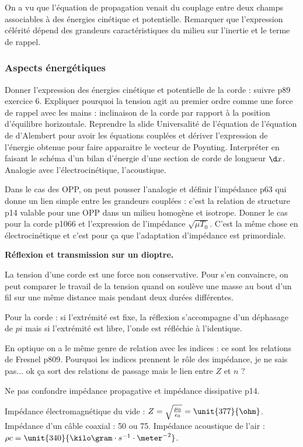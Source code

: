 \begin{transition}
On a vu que l'équation de propagation venait du couplage entre deux champs associables à des énergies  cinétique et potentielle.
Remarquer que l'expression célérité dépend des grandeurs caractéristiques du milieu sur l'inertie et le terme de rappel.
\end{transition}

\subsubsection{Aspects énergétiques}

Donner l'expression des énergies cinétique et potentielle de la corde : suivre  \cite{Brebec2004} p89 exercice 6.
Expliquer pourquoi la tension agit au premier ordre comme une force de rappel avec les mains : inclinaison de la corde par rapport à la position d'équilibre horizontale.
Reprendre la slide \og Universalité de l'équation de l'équation de d'Alembert \fg{} pour avoir les équations couplées et dériver l'expression de l'énergie obtenue pour faire apparaitre le vecteur de Poynting.
Interpréter en faisant le schéma d'un bilan d'énergie d'une section de corde de longueur $\d x$.
Analogie avec l'électrocinétique, l'acoustique.

Dans le cas des OPP, on peut pousser l'analogie et définir l'impédance \cite{Brebec2004} p63 qui donne un lien simple entre les grandeurs couplées : c'est la relation de structure \cite{Thibierge2014} p14 valable pour une OPP dans un milieu homogène et isotrope.
Donner le cas pour la corde \cite{Sanz2016} p1066 et l'expression de l'impédance $\sqrt{\mu T_0}$.
C'est la même chose en électrocinétique et c'est pour ça que l'adaptation d'impédance est primordiale.

\begin{slide}
\textbf{Réflexion et transmission sur un dioptre.}
\end{slide}

\begin{remarque}
La tension d'une corde est une force non conservative.
Pour s'en convaincre, on peut comparer le travail de la tension quand on soulève une masse au bout d'un fil sur une même distance mais pendant deux durées différentes.

\noindent
Pour la corde : si l'extrémité est fixe, la réflexion s'accompagne d'un déphasage de $pi$ mais si l'extrémité est libre, l'onde est réfléchie à l'identique. 

\noindent
En optique on a le même genre de relation avec les indices : ce sont les relations de Fresnel \cite{Olivier2000} p809.
Pourquoi les indices prennent le rôle des impédance, je ne sais pas... ok ça sort des relations de passage mais le lien entre $Z$ et $n$ ?

\noindent
Ne pas confondre impédance propagative et impédance dissipative \cite{Thibierge2014} p14.

\noindent
Impédance électromagnétique du vide : $Z=\sqrt{\frac{\mu_0}{\epsilon_0}}=\unit{377}{\ohm}$.
Impédance d'un câble coaxial : \unit{50}{\ohm} ou \unit{75}{\ohm}.
Impédance acoustique de l'air : $\rho c = \unit{340}{\kilo\gram\cdot s^{-1} \cdot \meter^{-2}}$.
\end{remarque}

